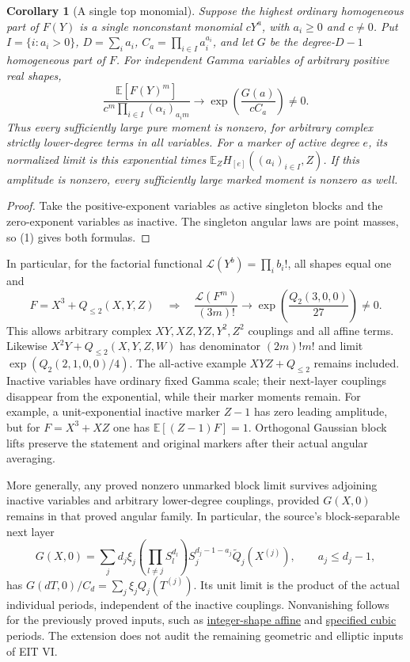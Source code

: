 \documentclass[11pt]{article}
\newtheorem{corollary}[theorem]{Corollary}
\newcommand{\E}{\mathbb E}
\begin{document}
\begin{corollary}[A single top monomial]\label{cor:monomialtop}
Suppose the highest ordinary homogeneous part of $F(Y)$ is a single
nonconstant monomial $cY^a$, with $a_i\geq0$ and $c\ne0$. Put
$I=\{i:a_i>0\}$, $D=\sum_i a_i$, $C_a=\prod_{i\in I}a_i^{a_i}$,
and let $G$ be the degree-$D-1$ homogeneous part of $F$.
For independent Gamma variables of arbitrary positive real shapes,
\[
 \frac{\E[F(Y)^m]}{c^m\prod_{i\in I}(\alpha_i)_{a_i m}}
 \longrightarrow \exp\!\left(\frac{G(a)}{cC_a}\right)\ne0.
\]
Thus every sufficiently large pure moment is nonzero, for arbitrary
complex strictly lower-degree terms in \emph{all} variables. For a
marker of active degree $e$, its normalized limit is this exponential
times $\E_Z H_{[e]}((a_i)_{i\in I},Z)$. If this amplitude is nonzero,
every sufficiently large marked moment is nonzero as well.
\end{corollary}
\begin{proof}
Take the positive-exponent variables as active singleton blocks and
the zero-exponent variables as inactive. The singleton angular laws
are point masses, so (1) gives both formulas.
\end{proof}
In particular, for the factorial functional
$\mathcal L(Y^b)=\prod_i b_i!$, all shapes equal one and
\[
 F=X^3+Q_{\leq2}(X,Y,Z)
 \quad\Longrightarrow\quad
 \frac{\mathcal L(F^m)}{(3m)!}
 \longrightarrow
 \exp\!\left(\frac{Q_2(3,0,0)}{27}\right)\ne0. \tag{1a}
\]
This allows arbitrary complex $XY,XZ,YZ,Y^2,Z^2$ couplings and
all affine terms. Likewise $X^2Y+Q_{\leq2}(X,Y,Z,W)$ has denominator
$(2m)!m!$ and limit $\exp(Q_2(2,1,0,0)/4)$.
The all-active example $XYZ+Q_{\leq2}$ remains included.
Inactive variables have ordinary fixed Gamma scale; their next-layer
couplings disappear from the exponential, while their marker moments remain.
For example, a unit-exponential inactive marker $Z-1$ has zero leading
amplitude, but for $F=X^3+XZ$ one has $\E[(Z-1)F]=1$.
Orthogonal Gaussian block lifts preserve the statement and original
markers after their actual angular averaging.

More generally, any proved nonzero unmarked block limit survives
adjoining inactive variables and arbitrary lower-degree couplings,
provided $G(X,0)$ remains in that proved angular family. In particular,
the source's block-separable next layer
\[
 G(X,0)=\sum_j d_j\xi_j\left(\prod_{l\ne j}S_l^{d_l}\right)
       S_j^{d_j-1-a_j}\widetilde Q_j(X^{(j)}),\qquad a_j\leq d_j-1,
\]
has $G(dT,0)/C_d=\sum_j\xi_jQ_j(T^{(j)})$. Its unit limit is the
product of the actual individual periods, independent of the inactive
couplings. Nonvanishing follows for the previously proved inputs, such as
\href{SIMPLEX_PENCILS_AND_AFFINE_LIMITS.tex}{integer-shape affine} and
\href{TWO_ANGULAR_COORDINATES.tex}{specified cubic} periods. The extension
does not audit the remaining geometric and elliptic inputs of EIT VI.
\end{document}
